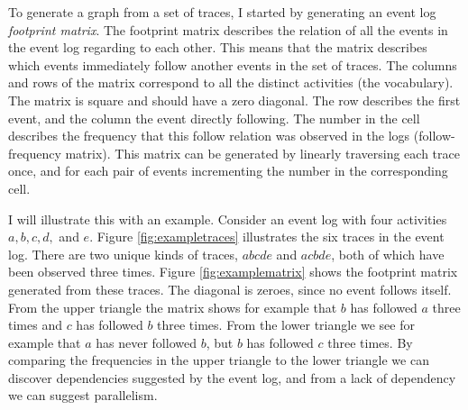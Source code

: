 To generate a graph from a set of traces, I started by generating an event log \emph{footprint matrix}.
The footprint matrix describes the relation of all the events in the event log regarding to each other.
This means that the matrix describes which events immediately follow another events in the set of traces.
The columns and rows of the matrix correspond to all the distinct activities (the vocabulary).
The matrix is square and should have a zero diagonal.
The row describes the first event, and the column the event directly following.
The number in the cell describes the frequency that this follow relation was observed in the logs (follow-frequency matrix).
This matrix can be generated by linearly traversing each trace once, and for each pair of events incrementing the number in the corresponding cell.

I will illustrate this with an example. Consider an event log with four activities $a,b,c,d,$ and $e$.
Figure \ref{fig:exampletraces} illustrates the six traces in the event log. There are two unique kinds of traces, $abcde$ and $acbde$, both of which have been observed three times. Figure \ref{fig:examplematrix} shows the footprint matrix generated from these traces.
The diagonal is zeroes, since no event follows itself.
From the upper triangle the matrix shows for example that $b$ has followed $a$ three times and $c$ has followed $b$ three times. From the lower triangle we see for example that $a$ has never followed $b$, but $b$ has followed $c$ three times.
By comparing the frequencies in the upper triangle to the lower triangle we can discover dependencies suggested by the event log, and from a lack of dependency we can suggest parallelism.

